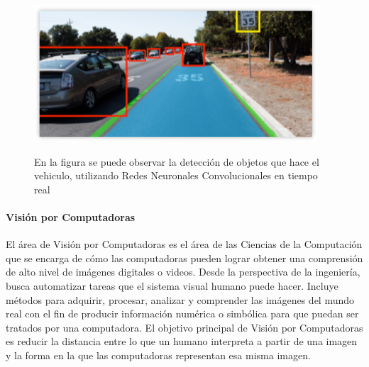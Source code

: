 \documentclass[a4paper,11pt,spanish]{book}
\begin{document}
    \begin{figure}[h]
      \includegraphics[width=0.9\linewidth]{./img/nvidia_car_detection.png}\\
      \caption{En la figura se puede observar la detección de objetos que hace el vehiculo, utilizando Redes Neuronales Convolucionales en tiempo real}
      \label{fig:car_detection}
    \end{figure}
    \paragraph{Visión por Computadoras}
      El área de Visión por Computadoras es el área de las Ciencias de la Computación que se encarga de cómo las computadoras pueden lograr obtener una comprensión de alto nivel de imágenes digitales o videos.
      Desde la perspectiva de la ingeniería, busca automatizar tareas que el sistema visual humano puede hacer. Incluye métodos para adquirir, procesar, analizar y comprender las imágenes del mundo real
      con el fin de producir información numérica o simbólica para que puedan ser tratados por una computadora. El objetivo principal de Visión por Computadoras es reducir la distancia
      entre lo que un humano interpreta a partir de una imagen y la forma en la que las computadoras representan esa misma imagen.\\
  
\end{document}
